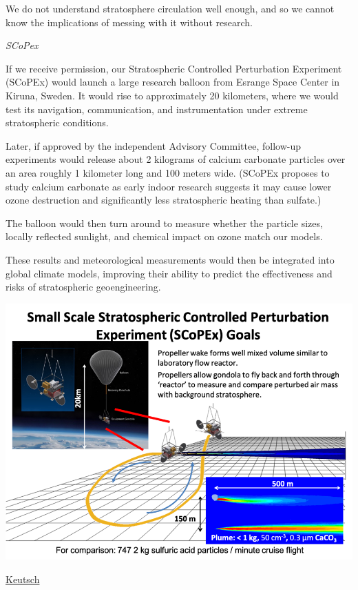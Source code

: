 \documentclass[
]{book}
\begin{document}
We do not understand stratosphere circulation well enough, and so we cannot know the implications of messing with it without research.

\emph{SCoPex}

If we receive permission, our Stratospheric Controlled Perturbation Experiment (SCoPEx) would launch a large research balloon from Esrange Space Center in Kiruna, Sweden. It would rise to approximately 20 kilometers, where we would test its navigation, communication, and instrumentation under extreme stratospheric conditions.

Later, if approved by the independent Advisory Committee, follow-up experiments would release about 2 kilograms of calcium carbonate particles over an area roughly 1 kilometer long and 100 meters wide. (SCoPEx proposes to study calcium carbonate as early indoor research suggests it may cause lower ozone destruction and significantly less stratospheric heating than sulfate.)

The balloon would then turn around to measure whether the particle sizes, locally reflected sunlight, and chemical impact on ozone match our models.

These results and meteorological measurements would then be integrated into global climate models, improving their ability to predict the effectiveness and risks of stratospheric geoengineering.

\includegraphics{fig/Scopex-Picture.png}

\href{https://www.c2g2.net/stratospheric-aerosol-injection-could-be-a-painkiller-but-not-a-cure-and-more-research-is-needed/}{Keutsch}
\end{document}
